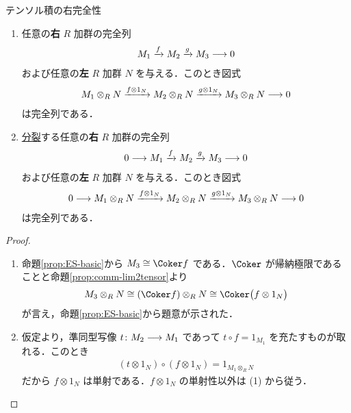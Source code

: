 \documentclass[algtopo_main]{subfiles}
\begin{document}
\begin{mycol}[label=col:RES-tensor]{テンソル積の右完全性}
	\begin{enumerate}
		\item 任意の\textbf{右} $R$ 加群の完全列
		\begin{align}
			M_1 \xrightarrow{f} M_2 \xrightarrow{g} M_3 \longrightarrow 0
		\end{align}
		および任意の\textbf{左} $R$ 加群 $N$ を与える．このとき図式
		\begin{align}
			M_1 \otimes_R N \xrightarrow{f \otimes 1_N} M_2 \otimes_R N \xrightarrow{g \otimes 1_N} M_3 \otimes_R N \longrightarrow 0
		\end{align}
		は完全列である．
		\item \hyperref[def:split]{分裂}する任意の\textbf{右} $R$ 加群の完全列
		\begin{align}
			0 \longrightarrow M_1 \xrightarrow{f} M_2 \xrightarrow{g} M_3 \longrightarrow 0
		\end{align}
		および任意の\textbf{左} $R$ 加群 $N$ を与える．このとき図式
		\begin{align}
			0 \longrightarrow M_1 \otimes_R N \xrightarrow{f \otimes 1_N} M_2 \otimes_R N \xrightarrow{g \otimes 1_N} M_3 \otimes_R N \longrightarrow 0
		\end{align}
		は完全列である．
	\end{enumerate}
\end{mycol}

\begin{proof}
	\begin{enumerate}
		\item 命題\ref{prop:ES-basic}から $M_3 \cong \Coker f$ である．$\Coker$ が帰納極限であることと命題\ref{prop:comm-lim2tensor}より
		\begin{align}
			M_3 \otimes_R N \cong (\Coker f) \otimes_R N \cong \Coker \bigl( f \otimes 1_N \bigr) 
		\end{align}
		が言え，命題\ref{prop:ES-basic}から題意が示された．
		\item 
		仮定より，準同型写像 $t \colon M_2 \longrightarrow M_1$ であって $t \circ f = 1_{M_1}$ を充たすものが取れる．このとき
		\begin{align}
			(t \otimes 1_N) \circ (f \otimes 1_N) = 1_{M_1 \otimes_R N}
		\end{align}
		だから $f \otimes 1_N$ は単射である．$f \otimes 1_N$ の単射性以外は (1) から従う．
	\end{enumerate}
	
\end{proof}




	
\end{document}
